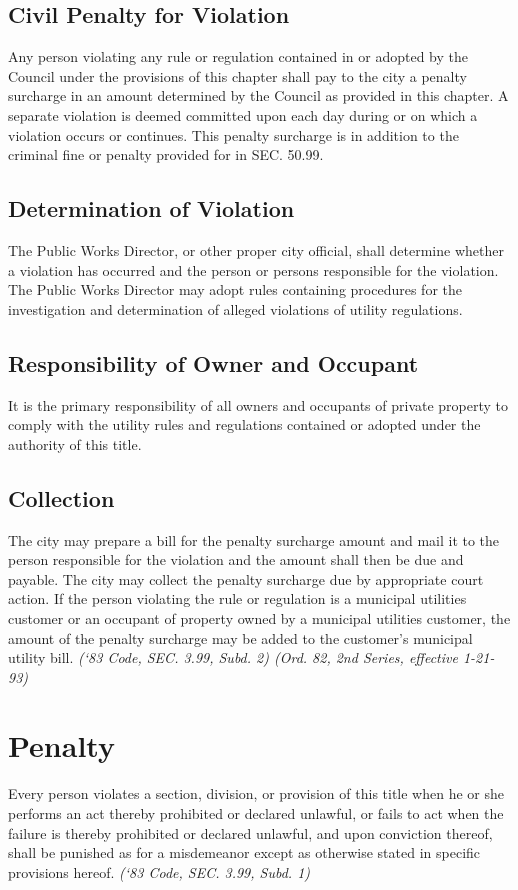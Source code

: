 \subsection{Civil Penalty for Violation}
Any person violating any rule or regulation contained in or adopted by the Council under the provisions of this chapter shall pay to the city a penalty surcharge in an amount determined by the Council as provided in this chapter.  A separate violation is deemed committed upon each day during or on which a violation occurs or continues.  This penalty surcharge is in addition to the criminal fine or penalty provided for in SEC. 50.99.
\subsection{Determination of Violation}
The Public Works Director, or other proper city official, shall determine whether a violation has occurred and the person or persons responsible for the violation.  The Public Works Director may adopt rules containing procedures for the investigation and determination of alleged violations of utility regulations.
\subsection{Responsibility of Owner and Occupant}
It is the primary responsibility of all owners and occupants of private property to comply with the utility rules and regulations contained or adopted under the authority of this title.
\subsection{Collection}
The city may prepare a bill for the penalty surcharge amount and mail it to the person responsible for the violation and the amount shall then be due and payable.  The city may collect the penalty surcharge due by appropriate court action.  If the person violating the rule or regulation is a municipal utilities customer or an occupant of property owned by a municipal utilities customer, the amount of the penalty surcharge may be added to the customer’s municipal utility bill.\newline
\emph{(‘83 Code, SEC. 3.99, Subd. 2) (Ord. 82, 2nd Series, effective 1-21-93)}
\section{Penalty}
Every person violates a section, division, or provision of this title when he or she performs an act thereby prohibited or declared unlawful, or fails to act when the failure is thereby prohibited or declared unlawful, and upon conviction thereof, shall be punished as for a misdemeanor except as otherwise stated in specific provisions hereof.\newline
\emph{(‘83 Code, SEC. 3.99, Subd. 1)}
